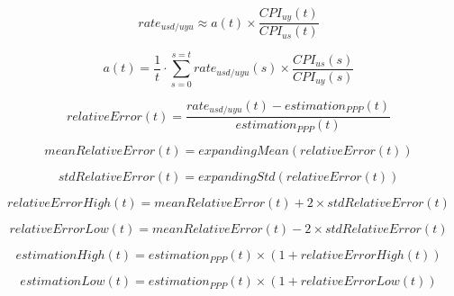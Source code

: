 \documentclass[12pt]{article}
\begin{document}
$$rate_{usd/uyu} \approx a(t) \times \frac{CPI_{uy}(t)}{CPI_{us}(t)}$$

$$a(t) = \frac{1}{t} \cdot \sum_{s=0}^{s=t} rate_{usd/uyu}(s) \times \frac{CPI_{us}(s)}{CPI_{uy}(s)}$$

$$relativeError(t) = \frac{rate_{usd/uyu}(t) - estimation_{PPP}(t)}{estimation_{PPP}(t)}$$

$$meanRelativeError(t) = expandingMean(relativeError(t))$$

$$stdRelativeError(t) = expandingStd(relativeError(t))$$

$$relativeErrorHigh(t) = meanRelativeError(t) + 2 \times stdRelativeError(t)$$

$$relativeErrorLow(t) = meanRelativeError(t) - 2 \times stdRelativeError(t)$$

$$estimationHigh(t) = estimation_{PPP}(t) \times (1 + relativeErrorHigh(t))$$

$$estimationLow(t) = estimation_{PPP}(t) \times (1 + relativeErrorLow(t))$$
\end{document}
